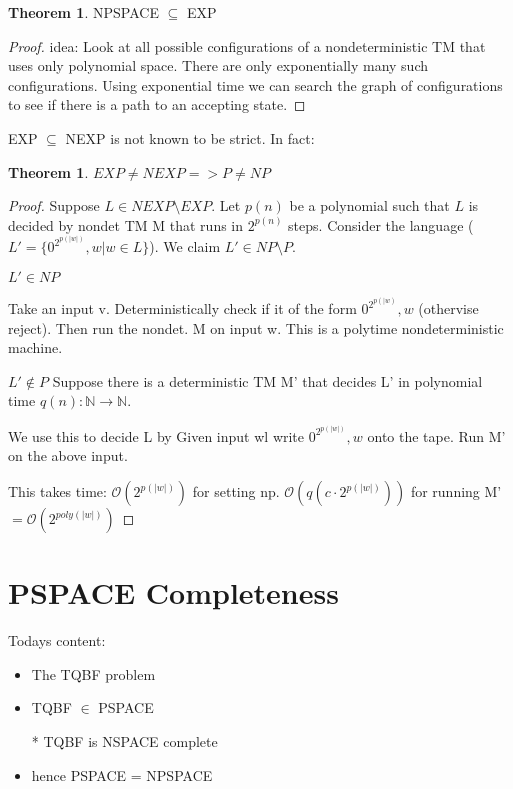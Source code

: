 \documentclass[a4paper,12pt]{article}
\theoremstyle{definition}
\newtheorem{theorem}[counter]{Theorem}
\theoremstyle{remark}
\newcommand{\N}{\mathbb{N}}
\begin{document}
\begin{theorem}
    NPSPACE $\subseteq$ EXP
\end{theorem}

\begin{proof}
    idea: Look at all possible configurations of a nondeterministic TM that uses only polynomial space.
    There are only exponentially many such configurations. Using exponential time we can search the graph of configurations to see
    if there is a path to an accepting state.
\end{proof}

EXP $\subseteq$ NEXP is not known to be strict. In fact:

\begin{theorem}
    $EXP \neq NEXP => P \neq NP$
\end{theorem}

\begin{proof}
    Suppose $L \in NEXP \setminus EXP$. Let $p(n)$ be a polynomial such that $L$ is decided by nondet TM M that runs in $2^{p(n)}$ steps.
    Consider the language ($L' = \{0^{2^{p(|w|)}}, w | w \in L\}$). We claim $L' \in NP \setminus P$.
    
    $L' \in NP$
    
    Take an input v. Deterministically check if it of the form $0^{2^{p(|w)}}, w$ (othervise reject). Then run the nondet.
    M on input w. This is a polytime nondeterministic machine.
    
    $L' \notin P$
    Suppose there is a deterministic TM M' that decides L' in polynomial time $q(n): \N \to \N$.
    
    We use this to decide L by Given input wl write $0^{2^{p(|w|)}}, w$ onto the tape. Run M' on the above input.
    
    This takes time: $\mathscr{O}(2^{p(|w|)})$ for setting np. $\mathscr{O}(q(c\cdot2^{p(|w|)}))$ for running M'
    $= \mathscr{O}(2^{poly(|w|)})$
\end{proof}

\newpage
\section{PSPACE Completeness}
Todays content:
\begin{itemize}
    \item The TQBF problem
    \item TQBF $\in$ PSPACE
    \item[*] TQBF is NSPACE complete
    \item hence PSPACE = NPSPACE  
\end{itemize}
\end{document}

